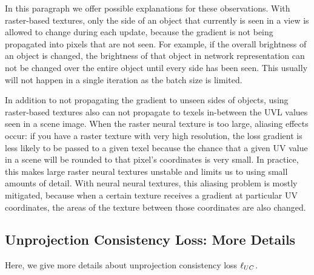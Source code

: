 	In this paragraph we offer possible explanations for these observations.
	With raster-based textures, only the side of an object that currently is seen in a view is allowed to change during each update, because the gradient is not being propagated into pixels that are not seen.
	For example, if the overall brightness of an object is changed, the brightness of that object in network representation can not be changed over the entire object until every side has been seen. This usually will not happen in a single iteration as the batch size is limited.

	In addition to not propagating the gradient to unseen sides of objects, using raster-based textures also can not propagate to texels in-between the UVL values seen in a scene image.
	When the raster neural texture is too large, aliasing effects occur: if you have a raster texture with very high resolution, the loss gradient is less likely to be passed to a given texel because the chance that a given UV value in a scene will be rounded to that pixel's coordinates is very small.
	In practice, this makes large raster neural textures unstable and limits us to using small amounts of detail.
	With neural neural textures, this aliasing problem is mostly mitigated, because when a certain texture receives a gradient at particular UV coordinates, the areas of the texture between those coordinates are also changed.

\subsection{Unprojection Consistency Loss: More Details}

	Here, we give more details about unprojection consistency loss $\ell_{UC}$.


